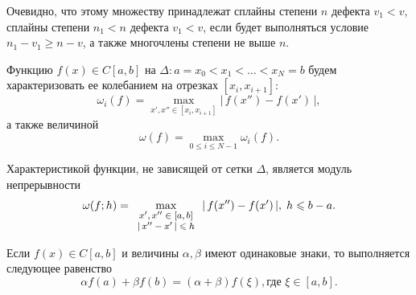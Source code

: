 ﻿\documentclass[a4paper,14pt]{extreport}
\begin{document}
{\begin{definition}
    \end{definition}
    Очевидно, что этому множеству принадлежат сплайны степени $n$ дефекта $v_1<v$, сплайны степени $n_1<n$ дефекта $v_1<v$, если будет выполняться условие $n_1-v_1\geqslant n-v$, а также многочлены степени не выше $n$.
    \begin{definition}
        Функцию $f(x)\in C[a,b]$ на $\Delta:a=x_0<x_1<\ldots<x_N=b$ будем характеризовать ее колебанием на отрезках $[x_i,x_{i+1}]$:
        \begin{equation*}
            \omega_i(f)=\max\limits_{x',x''\in [x_i,x_{i+1}]}{|\,f(x'')-f(x')\,|},
        \end{equation*}
        а также величиной
        \begin{equation*}
            \omega(f)=\max\limits_{0\leqslant i\leqslant N-1}{\omega_i(f)}.
        \end{equation*}
         \par Характеристикой функции, не зависящей от сетки $\Delta$, является модуль непрерывности 
         \begin{equation*}
               \omega(f;h)=\max\limits_{\footnotesize\begin{array}c x',x''\in [a,b] \\ |\,x''-x'\,|\leqslant h\end{array}}{|\,f(x'')-f(x')\,|},\;h\leqslant b-a.
         \end{equation*}
    \end{definition}
    \begin{theorem}[о среднем]
        Если $f(x)\in C[a,b]$ и величины $\alpha,\beta$ имеют одинаковые знаки, то выполняется следующее равенство
        \begin{equation*}
            \alpha f(a)+\beta f(b)=(\alpha+\beta)f(\xi), \mbox{где }\xi\in[a,b].
        \end{equation*}
    \end{theorem}
}
\end{document}
